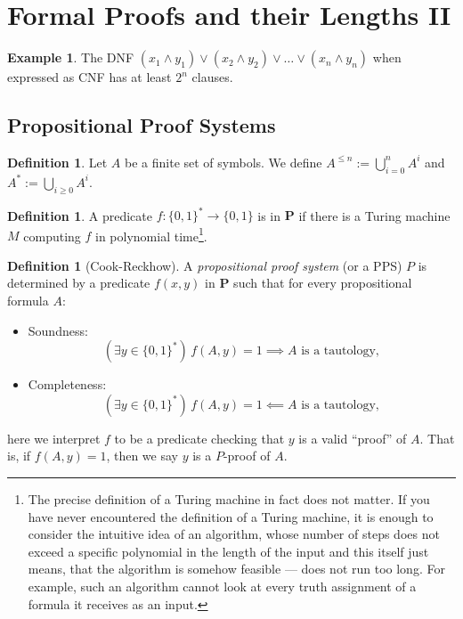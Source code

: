 \documentclass{article}
\theoremstyle{definition}
\newtheorem{exmp}[thrm]{Example}
\newtheorem{defi}[thrm]{Definition}
\renewcommand{\P}{\textbf{P}}
\begin{document}
\section*{Formal Proofs and their Lengths II}

\begin{exmp}
    The DNF $(x_1\land y_1)\lor (x_2\land y_2) \lor \dots \lor (x_n \land y_n)$ when expressed as CNF has at least $2^n$ clauses.
\end{exmp}


\subsection*{Propositional Proof Systems}

\begin{defi}
    Let $A$ be a finite set of symbols. We define $A^{\leq n}:= \bigcup_{i=0}^n A^i$ and $A^* := \bigcup_{i\geq 0} A^i$.
\end{defi}

\begin{defi}
    A predicate $f:\{0,1\}^* \to \{0,1\}$ is in $\P$ if there is a Turing machine $M$ computing $f$ in polynomial time\footnote{The precise definition of a Turing machine in fact does not matter. If you have never encountered the definition of a Turing machine, it is enough to consider the intuitive idea of an algorithm, whose number of steps does not exceed a specific polynomial in the length of the input and this itself just means, that the algorithm is somehow feasible --- does not run too long. For example, such an algorithm cannot look at every truth assignment of a formula it receives as an input.}.
\end{defi}

\begin{defi}[Cook-Reckhow] A \emph{propositional proof system} (or a PPS) $P$ is determined by a predicate $f(x,y)$ in $\P$ such that for every propositional formula $A$:
    \begin{itemize}
        \item Soundness:
    \[
     (\exists y\in \{0,1\}^*) \, f(A,y)=1
        \implies
        \text{$A$ is a tautology}, 
     \]
        \item Completeness:
    \[
     (\exists y\in \{0,1\}^*) \, f(A,y)=1
        \impliedby
        \text{$A$ is a tautology}, 
     \]
    \end{itemize}
    here we interpret $f$ to be a predicate checking that $y$ is a valid ``proof'' of $A$. That is, if $f(A,y)=1$, then we say $y$ is a $P$-proof of $A$.
\end{defi}
\end{document}
